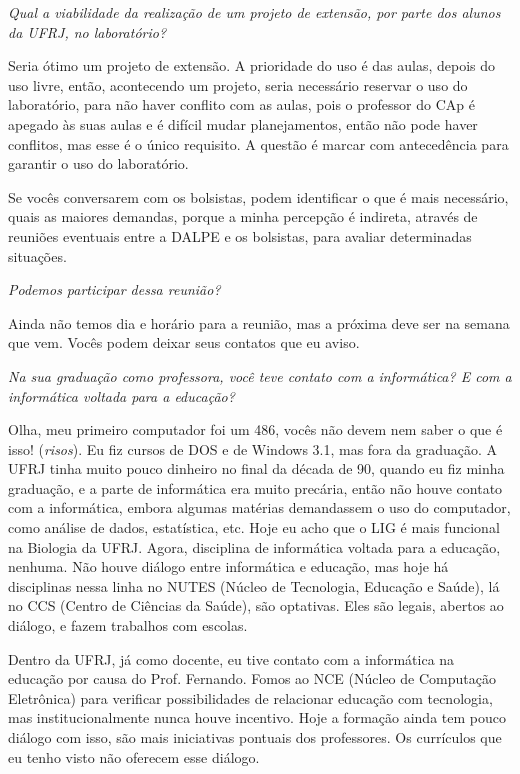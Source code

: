 \textit{Qual a viabilidade da realização de um projeto de extensão, por parte dos alunos da UFRJ, no laboratório?}

Seria ótimo um projeto de extensão. A prioridade do uso é das aulas, depois do uso livre, então, acontecendo um projeto, seria necessário reservar o uso do laboratório, para não haver conflito com as aulas, pois o professor do CAp é apegado às suas aulas e é difícil mudar planejamentos, então não pode haver conflitos, mas esse é o único requisito. A questão é marcar com antecedência para garantir o uso do laboratório.

Se vocês conversarem com os bolsistas, podem identificar o que é mais necessário, quais as maiores demandas, porque a minha percepção é indireta, através de reuniões eventuais entre a DALPE e os bolsistas, para avaliar determinadas situações.

\textit{Podemos participar dessa reunião?}

Ainda não temos dia e horário para a reunião, mas a próxima deve ser na semana que vem. Vocês podem deixar seus contatos que eu aviso.

\textit{Na sua graduação como professora, você teve contato com a informática? E com a informática voltada para a educação?}

Olha, meu primeiro computador foi um 486, vocês não devem nem saber o que é isso! (\textit{risos}). Eu fiz cursos de DOS e de Windows 3.1, mas fora da graduação. A UFRJ tinha muito pouco dinheiro no final da década de 90, quando eu fiz minha graduação, e a parte de informática era muito precária, então não houve contato com a informática, embora algumas matérias demandassem o uso do computador, como análise de dados, estatística, etc. Hoje eu acho que o LIG é mais funcional na Biologia da UFRJ. Agora, disciplina de informática voltada para a educação, nenhuma. Não houve diálogo entre informática e educação, mas hoje há disciplinas nessa linha no NUTES (Núcleo de Tecnologia, Educação e Saúde), lá no CCS (Centro de Ciências da Saúde), são optativas. Eles são legais, abertos ao diálogo, e fazem trabalhos com escolas.

Dentro da UFRJ, já como docente, eu tive contato com a informática na educação por causa do Prof. Fernando. Fomos ao NCE (Núcleo de Computação Eletrônica) para verificar possibilidades de relacionar educação com tecnologia, mas institucionalmente nunca houve incentivo. Hoje a formação ainda tem pouco diálogo com isso, são mais iniciativas pontuais dos professores. Os currículos que eu tenho visto não oferecem esse diálogo.

